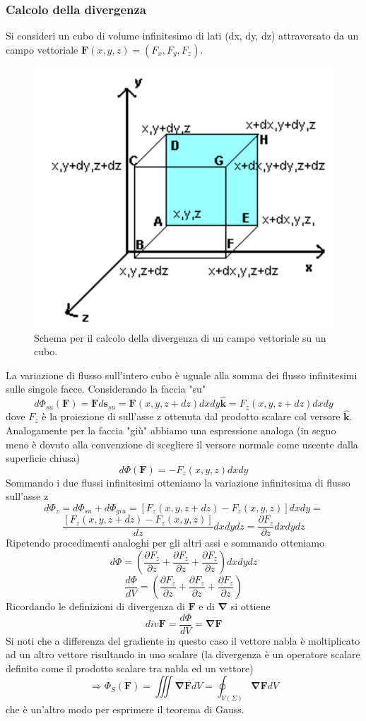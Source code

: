 \documentclass[10pt,a4paper]{article}
\begin{document}
\subsubsection{Calcolo della divergenza}
Si consideri un cubo di volume infinitesimo di lati (dx, dy, dz) attraversato da un campo vettoriale $\mathbf{F}(x,y,z) = (F_x, F_y, F_z)$.  
\begin{figure}[h!]
	\centering
	\includegraphics[width=0.6\linewidth]{images/div_quadrato}
	\caption{Schema per il calcolo della divergenza di un campo vettoriale su un cubo.}
	\label{fig:divquadrato}
\end{figure}
\FloatBarrier
La variazione di flusso sull'intero cubo è uguale alla somma dei flusso infinitesimi sulle singole facce. Considerando la faccia "su"
\[d\Phi_{su}(\mathbf{F}) = \mathbf{F}d\mathbf{s}_{su} = \mathbf{F}(x, y, z + dz)dxdy\hat{\mathbf{k}}=F_z(x, y, z + dz)dxdy\]
dove \(F_z\) è la proiezione di sull'asse z ottenuta dal prodotto scalare col versore \(\hat{\mathbf{k}}\). 
Analogamente per la faccia "giù" abbiamo una espressione analoga (in segno meno è dovuto alla convenzione di scegliere il versore normale come uscente dalla superficie chiusa)
\[d\Phi(\mathbf{F}) = -F_z(x, y, z)dxdy\]
Sommando i due flussi infinitesimi otteniamo la variazione infinitesima di flusso sull'asse z
\[d\Phi_z= d\Phi_{su}+d\Phi_{giu}=\left[F_z(x,y,z+dz)-F_z(x,y,z)\right]dxdy=\]
\[\frac{\left[F_z(x,y,z+dz)-F_z(x,y,z)\right]}{dz}dxdydz=\frac{\partial F_z}{\partial z}dxdydz\]
Ripetendo procedimenti analoghi per gli altri assi e sommando otteniamo
\[d\Phi = \left(\frac{\partial F_z}{\partial z}+ \frac{\partial F_z}{\partial z}+ \frac{\partial F_z}{\partial z}\right)dxdydz \]
\[\frac{d\Phi}{dV} = \left(\frac{\partial F_z}{\partial z}+ \frac{\partial F_z}{\partial z}+ \frac{\partial F_z}{\partial z}\right)\]
Ricordando le definizioni di divergenza di $\mathbf{F}$ e di \(\mathbf{\nabla}\) si ottiene
\[div\mathbf{F} = \frac{d\Phi}{dV} = \mathbf{\nabla}\mathbf{F}\]
Si noti che a differenza del gradiente in questo caso il vettore nabla è moltiplicato ad un altro vettore risultando in uno scalare (la divergenza è un operatore scalare definito come il prodotto scalare tra nabla ed un vettore)
\[\Rightarrow \Phi_S(\mathbf{F}) = \iiint \mathbf{\nabla}\mathbf{F}dV = \oint_{V(\Sigma)} \mathbf{\nabla}\mathbf{F}dV\]
che è un'altro modo per esprimere il teorema di Gauss.
\end{document}
